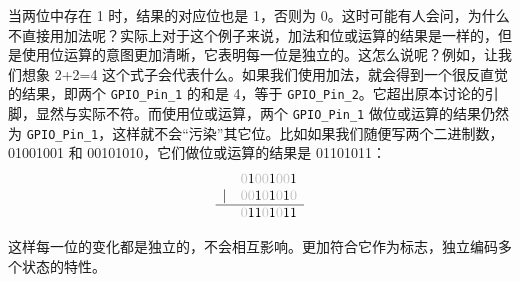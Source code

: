 \begin{itemize}
    当两位中存在 1 时，结果的对应位也是 1，否则为 0。这时可能有人会问，为什么不直接用加法呢？实际上对于这个例子来说，加法和位或运算的结果是一样的，但是使用位运算的意图更加清晰，它表明每一位是独立的。这怎么说呢？例如，让我们想象 2+2=4 这个式子会代表什么。如果我们使用加法，就会得到一个很反直觉的结果，即两个 \texttt{GPIO\_Pin\_1} 的和是 4，等于 \texttt{GPIO\_Pin\_2}。它超出原本讨论的引脚，显然与实际不符。而使用位或运算，两个 \texttt{GPIO\_Pin\_1} 做位或运算的结果仍然为 \texttt{GPIO\_Pin\_1}，这样就不会“污染”其它位。比如如果我们随便写两个二进制数，01001001 和 00101010，它们做位或运算的结果是 01101011：
    \[
    \begin{array}{cc}
        & \color{lightgray}0{\color{black}1}00{\color{black}1}00{\color{black}1} \\
        {|} & \color{lightgray}00{\color{black}1}0{\color{black}1}0{\color{black}1}0 \\
        \hline
        & \color{lightgray}0{\color{black}11}0{\color{black}1}0{\color{black}11}
    \end{array}
    \]

    这样每一位的变化都是独立的，不会相互影响。更加符合它作为标志，独立编码多个状态的特性。
\end{itemize}